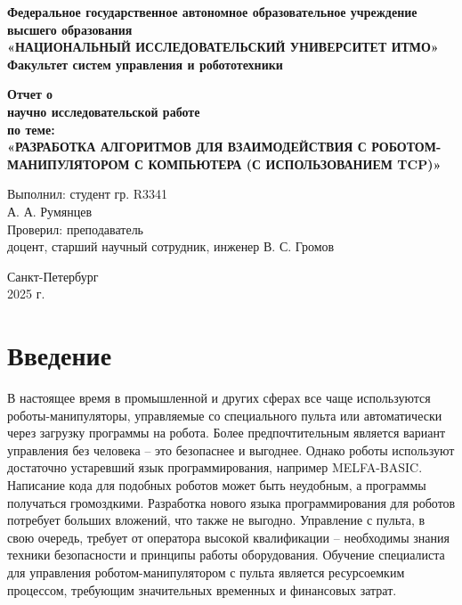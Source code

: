 \documentclass[a4paper,14pt]{extarticle}
\begin{document}
\begin{titlepage}
    \begin{center}
        \textbf{Федеральное государственное автономное образовательное учреждение высшего образования}\\
        \textbf{«НАЦИОНАЛЬНЫЙ ИССЛЕДОВАТЕЛЬСКИЙ УНИВЕРСИТЕТ ИТМО»}\medskip\\
        \textbf{Факультет систем управления и робототехники}
        \vfill

        {\large\bfseries Отчет о}\\
        {\large\bfseries научно исследовательской работе}\medskip\\
        {\large\bfseries по теме:}\\
        {\large\bfseries «РАЗРАБОТКА АЛГОРИТМОВ ДЛЯ ВЗАИМОДЕЙСТВИЯ С РОБОТОМ-МАНИПУЛЯТОРОМ С КОМПЬЮТЕРА (С ИСПОЛЬЗОВАНИЕМ TCP)»}
        \vfill

        \begin{flushright}
            Выполнил: студент гр. R3341\\
            А. А. Румянцев\medskip\\

            Проверил: преподаватель\\
            доцент, старший научный сотрудник, инженер В. С. Громов
        \end{flushright}

        \vfill

        Санкт-Петербург\\
        2025 г.
    \end{center}
\end{titlepage}

\setcounter{page}{2}
\tableofcontents
\newpage


\section*{Введение}
\setcounter{section}{0}
В настоящее время в промышленной и других сферах все чаще
используются роботы-манипуляторы, управляемые
со специального пульта или автоматически
через загрузку программы на робота.
Более предпочтительным является вариант
управления без человека -- это безопаснее
и выгоднее. Однако роботы используют
достаточно устаревший язык программирования,
например MELFA-BASIC. Написание кода
для подобных роботов может быть неудобным,
а программы получаться громоздкими.
Разработка нового языка программирования
для роботов потребует больших вложений,
что также не выгодно. Управление с пульта,
в свою очередь,
требует от оператора высокой квалификации --
необходимы знания техники безопасности и
принципы работы оборудования. Обучение
специалиста для управления роботом-манипулятором с пульта
является ресурсоемким процессом, требующим
значительных временных и финансовых затрат.
\end{document}
